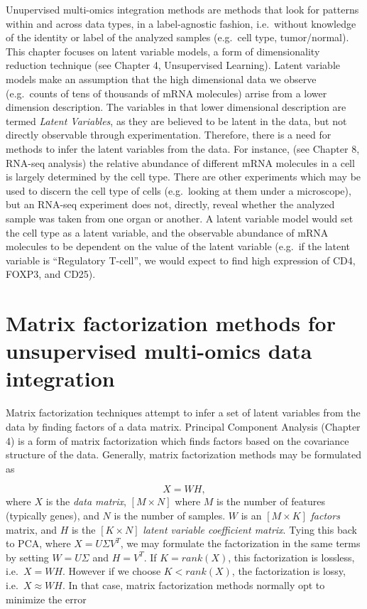 \documentclass[12pt,]{krantz}
\begin{document}
Unupervised multi-omics integration methods are methods that look for patterns within and across data types, in a label-agnostic fashion, i.e.~without knowledge of the identity or label of the analyzed samples (e.g.~cell type, tumor/normal). This chapter focuses on latent variable models, a form of dimensionality reduction technique (see Chapter 4, Unsupervised Learning). Latent variable models make an assumption that the high dimensional data we observe (e.g.~counts of tens of thousands of mRNA molecules) arrise from a lower dimension description. The variables in that lower dimensional description are termed \emph{Latent Variables}, as they are believed to be latent in the data, but not directly observable through experimentation. Therefore, there is a need for methods to infer the latent variables from the data. For instance, (see Chapter 8, RNA-seq analysis) the relative abundance of different mRNA molecules in a cell is largely determined by the cell type. There are other experiments which may be used to discern the cell type of cells (e.g.~looking at them under a microscope), but an RNA-seq experiment does not, directly, reveal whether the analyzed sample was taken from one organ or another. A latent variable model would set the cell type as a latent variable, and the observable abundance of mRNA molecules to be dependent on the value of the latent variable (e.g.~if the latent variable is ``Regulatory T-cell'', we would expect to find high expression of CD4, FOXP3, and CD25).

\hypertarget{matrix-factorization-methods-for-unsupervised-multi-omics-data-integration}{%
\section{Matrix factorization methods for unsupervised multi-omics data integration}\label{matrix-factorization-methods-for-unsupervised-multi-omics-data-integration}}

Matrix factorization techniques attempt to infer a set of latent variables from the data by finding factors of a data matrix. Principal Component Analysis (Chapter 4) is a form of matrix factorization which finds factors based on the covariance structure of the data. Generally, matrix factorization methods may be formulated as

\[
X = WH,
\]
where \(X\) is the \emph{data matrix}, \([M \times N]\) where \(M\) is the number of features (typically genes), and \(N\) is the number of samples. \(W\) is an \([M \times K]\) \emph{factors} matrix, and \(H\) is the \([K \times N]\) \emph{latent variable coefficient matrix}. Tying this back to PCA, where \(X = U \Sigma V^T\), we may formulate the factorization in the same terms by setting \(W=U\Sigma\) and \(H=V^T\). If \(K=rank(X)\), this factorization is lossless, i.e.~\(X=WH\). However if we choose \(K<rank(X)\), the factorization is lossy, i.e.~\(X \approx WH\). In that case, matrix factorization methods normally opt to minimize the error
\end{document}
